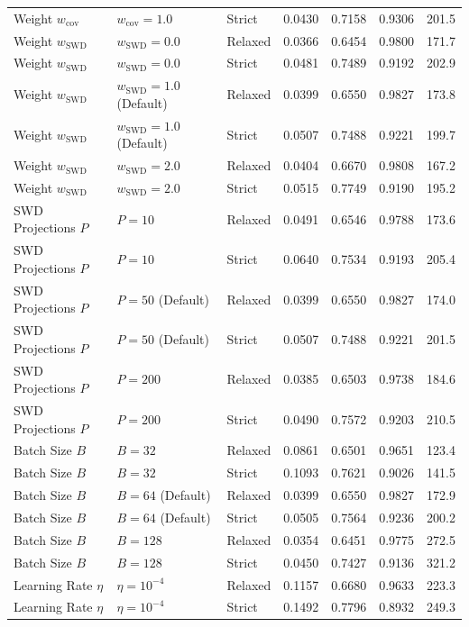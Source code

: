 \begin{tabular}{lllllll}
Weight $w_{\mathrm{cov}}$ & $w_{\mathrm{cov}}=1.0$ & Strict & 0.0430 & 0.7158 & 0.9306 & 201.5 \\
Weight $w_{\mathrm{SWD}}$ & $w_{\mathrm{SWD}}=0.0$ & Relaxed & 0.0366 & 0.6454 & 0.9800 & 171.7 \\
Weight $w_{\mathrm{SWD}}$ & $w_{\mathrm{SWD}}=0.0$ & Strict & 0.0481 & 0.7489 & 0.9192 & 202.9 \\
Weight $w_{\mathrm{SWD}}$ & $w_{\mathrm{SWD}}=1.0$ (Default) & Relaxed & 0.0399 & 0.6550 & 0.9827 & 173.8 \\
Weight $w_{\mathrm{SWD}}$ & $w_{\mathrm{SWD}}=1.0$ (Default) & Strict & 0.0507 & 0.7488 & 0.9221 & 199.7 \\
Weight $w_{\mathrm{SWD}}$ & $w_{\mathrm{SWD}}=2.0$ & Relaxed & 0.0404 & 0.6670 & 0.9808 & 167.2 \\
Weight $w_{\mathrm{SWD}}$ & $w_{\mathrm{SWD}}=2.0$ & Strict & 0.0515 & 0.7749 & 0.9190 & 195.2 \\
SWD Projections $P$ & $P=10$ & Relaxed & 0.0491 & 0.6546 & 0.9788 & 173.6 \\
SWD Projections $P$ & $P=10$ & Strict & 0.0640 & 0.7534 & 0.9193 & 205.4 \\
SWD Projections $P$ & $P=50$ (Default) & Relaxed & 0.0399 & 0.6550 & 0.9827 & 174.0 \\
SWD Projections $P$ & $P=50$ (Default) & Strict & 0.0507 & 0.7488 & 0.9221 & 201.5 \\
SWD Projections $P$ & $P=200$ & Relaxed & 0.0385 & 0.6503 & 0.9738 & 184.6 \\
SWD Projections $P$ & $P=200$ & Strict & 0.0490 & 0.7572 & 0.9203 & 210.5 \\
Batch Size $B$ & $B=32$ & Relaxed & 0.0861 & 0.6501 & 0.9651 & 123.4 \\
Batch Size $B$ & $B=32$ & Strict & 0.1093 & 0.7621 & 0.9026 & 141.5 \\
Batch Size $B$ & $B=64$ (Default) & Relaxed & 0.0399 & 0.6550 & 0.9827 & 172.9 \\
Batch Size $B$ & $B=64$ (Default) & Strict & 0.0505 & 0.7564 & 0.9236 & 200.2 \\
Batch Size $B$ & $B=128$ & Relaxed & 0.0354 & 0.6451 & 0.9775 & 272.5 \\
Batch Size $B$ & $B=128$ & Strict & 0.0450 & 0.7427 & 0.9136 & 321.2 \\
Learning Rate $\eta$ & $\eta=10^{-4}$ & Relaxed & 0.1157 & 0.6680 & 0.9633 & 223.3 \\
Learning Rate $\eta$ & $\eta=10^{-4}$ & Strict & 0.1492 & 0.7796 & 0.8932 & 249.3 \\

\end{tabular}
